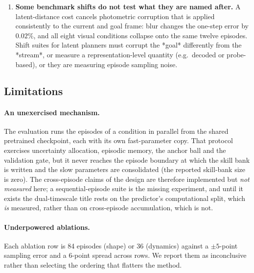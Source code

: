 \begin{enumerate}[leftmargin=1.2em,itemsep=2pt]
anchor ball binds after every Adam step with $594.7$k fast parameters, so the effective step
size is set by the trust region rather than the learning rate. The mechanism behaved exactly as
specified --- and that is why the method stopped behaving like AdaJEPA-plus-adaptation. Any
online-adaptation method with an anchor needs the anchor radius calibrated against
$\eta\sqrt{n}$, or the constraint must be reported as part of the method.
\item \textbf{Some benchmark shifts do not test what they are named after.} A latent-distance
cost cancels photometric corruption that is applied consistently to the current and goal frame:
blur changes the one-step error by $0.02\%$, and all eight visual conditions collapse onto the
same twelve episodes. Shift suites for latent planners must corrupt the *goal* differently from
the *stream*, or measure a representation-level quantity (e.g.\ decoded or probe-based), or they
are measuring episode sampling noise.
\end{enumerate}

\subsection{Limitations}\label{sec:limits}

\paragraph{An unexercised mechanism.} The evaluation runs the episodes of a condition in
parallel from the shared pretrained checkpoint, each with its own fast-parameter copy. That
protocol exercises uncertainty allocation, episodic memory, the anchor ball and the validation
gate, but it never reaches the episode boundary at which the skill bank is written and the slow
parameters are consolidated (the reported skill-bank size is zero). The cross-episode claims of
the design are therefore implemented but \emph{not measured} here; a sequential-episode suite is
the missing experiment, and until it exists the dual-timescale title rests on the predictor's
computational split, which \emph{is} measured, rather than on cross-episode accumulation, which
is not.

\paragraph{Underpowered ablations.} Each ablation row is 84 episodes (shape) or 36 (dynamics)
against a $\pm 5$-point sampling error and a 6-point spread across rows. We report them as
inconclusive rather than selecting the ordering that flatters the method.

